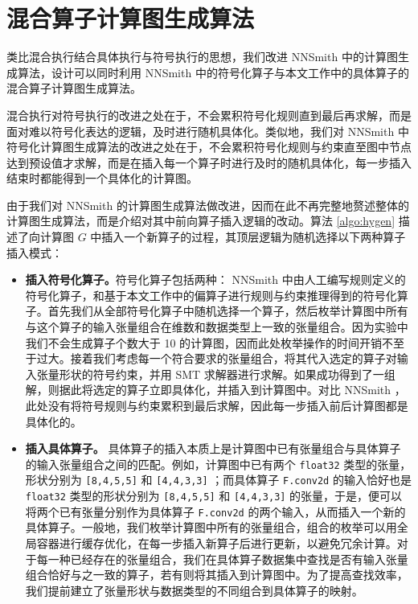 \section{混合算子计算图生成算法}

类比混合执行结合具体执行与符号执行的思想，我们改进 NNSmith 中的计算图生成算法，设计可以同时利用 NNSmith 中的符号化算子与本文工作中的具体算子的混合算子计算图生成算法。

混合执行对符号执行的改进之处在于，不会累积符号化规则直到最后再求解，而是面对难以符号化表达的逻辑，及时进行随机具体化。类似地，我们对 NNSmith 中符号化计算图生成算法的改进之处在于，不会累积符号化规则与约束直至图中节点达到预设值才求解，而是在插入每一个算子时进行及时的随机具体化，每一步插入结束时都能得到一个具体化的计算图。

由于我们对 NNSmith 的计算图生成算法做改进，因而在此不再完整地赘述整体的计算图生成算法，而是介绍对其中前向算子插入逻辑的改动。算法 \ref{algo:hygen} 描述了向计算图 $G$ 中插入一个新算子的过程，其顶层逻辑为随机选择以下两种算子插入模式：
\begin{itemize}
    \item \textbf{插入符号化算子。}符号化算子包括两种： NNSmith 中由人工编写规则定义的符号化算子，和基于本文工作中的偏算子进行规则与约束推理得到的符号化算子。首先我们从全部符号化算子中随机选择一个算子，然后枚举计算图中所有与这个算子的输入张量组合在维数和数据类型上一致的张量组合。因为实验中我们不会生成算子个数大于 10 的计算图，因而此处枚举操作的时间开销不至于过大。接着我们考虑每一个符合要求的张量组合，将其代入选定的算子对输入张量形状的符号约束，并用 SMT 求解器进行求解。如果成功得到了一组解，则据此将选定的算子立即具体化，并插入到计算图中。对比 NNSmith ，此处没有将符号规则与约束累积到最后求解，因此每一步插入前后计算图都是具体化的。
    \item \textbf{插入具体算子。} 具体算子的插入本质上是计算图中已有张量组合与具体算子的输入张量组合之间的匹配。例如，计算图中已有两个 \texttt{float32} 类型的张量，形状分别为 \texttt{[8,4,5,5]} 和 \texttt{[4,4,3,3]} ；而具体算子 \texttt{F.conv2d} 的输入恰好也是 \texttt{float32} 类型的形状分别为 \texttt{[8,4,5,5]} 和 \texttt{[4,4,3,3]} 的张量，于是，便可以将两个已有张量分别作为具体算子 \texttt{F.conv2d} 的两个输入，从而插入一个新的具体算子。一般地，我们枚举计算图中所有的张量组合，组合的枚举可以用全局容器进行缓存优化，在每一步插入新算子后进行更新，以避免冗余计算。对于每一种已经存在的张量组合，我们在具体算子数据集中查找是否有输入张量组合恰好与之一致的算子，若有则将其插入到计算图中。为了提高查找效率，我们提前建立了张量形状与数据类型的不同组合到具体算子的映射。
\end{itemize}

